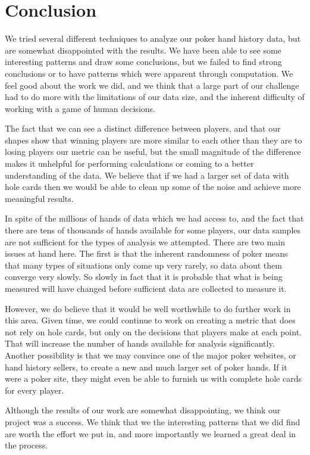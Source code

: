 \documentclass[11pt]{article}
\begin{document}
\section*{Conclusion}
We tried several different techniques to analyze our poker hand history data,
but are somewhat disappointed with the results. We have been able to see
some interesting patterns and draw some conclusions, but we failed to find strong
conclusions or to have patterns which were apparent through computation. We feel
good about the work we did, and we think that a large part of our challenge had
to do more with the limitations of our data size, and the inherent difficulty of
working with a game of human decisions.

The fact that we can see a distinct difference between players, and that our
shapes show that winning players are more similar to each other than they are
to losing players our metric can be useful, but the
small magnitude of the difference makes it unhelpful for performing calculations
or coming to a better understanding of the data. We believe that if we had a larger
set of data with hole cards then we would be able to clean up some of the noise
and achieve more meaningful results.

In spite of the millions of hands of data which we had access to, and the fact
that there are tens of thousands of hands available for some players, our data
samples are not sufficient for the types of analysis we attempted. There
are two main issues at hand here. The first is that the inherent randomness of
poker means that many types of situations only come up very rarely, so data
about them converge very slowly. So slowly in fact that it is probable that
what is being measured will have changed before sufficient data are collected
to measure it.

However, we do believe that it would be well worthwhile to do further work in
this area. Given time, we could continue to work on creating a metric that does
not rely on hole cards, but only on the decisions that players make at each point.
That will increase the number of hands available for analysis significantly. Another
possibility is that we may convince one of the major poker websites, or hand
history sellers, to create a new and much larger set of poker hands. If it were
a poker site, they might even be able to furnish us with complete hole cards
for every player.

Although the results of our work are somewhat disappointing, we think our project
was a success. We think that
we the interesting patterns that we did find are worth the effort we put in, and more
importantly we learned a great deal in the process.
\end{document}
